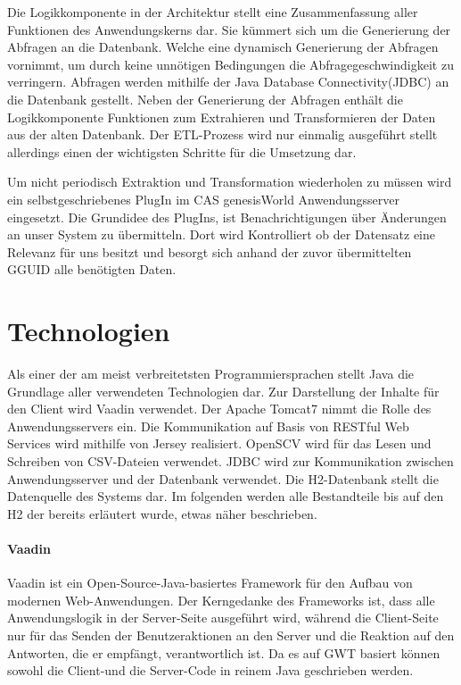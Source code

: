 Die Logikkomponente in der Architektur stellt eine Zusammenfassung aller Funktionen des Anwendungskerns dar. Sie kümmert sich um die Generierung der Abfragen an die Datenbank. Welche eine dynamisch Generierung der Abfragen vornimmt, um durch keine unnötigen Bedingungen die Abfragegeschwindigkeit zu verringern. Abfragen werden mithilfe der Java Database Connectivity(JDBC) an die Datenbank gestellt. Neben der Generierung der Abfragen enthält die Logikkomponente Funktionen zum Extrahieren und Transformieren der Daten aus der alten Datenbank. Der ETL-Prozess wird nur einmalig ausgeführt stellt allerdings einen der wichtigsten Schritte für die Umsetzung dar. 

Um nicht periodisch Extraktion und Transformation wiederholen zu müssen wird ein selbstgeschriebenes PlugIn im CAS genesisWorld Anwendungsserver eingesetzt. Die Grundidee des PlugIns, ist Benachrichtigungen über Änderungen an unser System zu übermitteln. Dort wird Kontrolliert ob der Datensatz eine Relevanz für uns besitzt und besorgt sich anhand der zuvor übermittelten GGUID alle benötigten Daten.

\section{Technologien}

Als einer der am meist verbreitetsten Programmiersprachen stellt Java die Grundlage aller verwendeten Technologien dar. Zur Darstellung der Inhalte für den Client wird Vaadin verwendet. Der Apache Tomcat7 nimmt die Rolle des Anwendungsservers ein. Die Kommunikation auf Basis von RESTful Web Services wird mithilfe von Jersey realisiert. OpenSCV wird für das Lesen und Schreiben von CSV-Dateien verwendet. JDBC wird zur Kommunikation zwischen Anwendungsserver und der Datenbank verwendet. Die H2-Datenbank stellt die Datenquelle des Systems dar. Im folgenden werden alle Bestandteile bis auf den H2 der bereits erläutert wurde, etwas näher beschrieben. 

\paragraph{Vaadin}

Vaadin ist ein Open-Source-Java-basiertes Framework für den Aufbau von modernen Web-Anwendungen. Der Kerngedanke des Frameworks ist, dass alle Anwendungslogik in der Server-Seite ausgeführt wird, während die Client-Seite nur für das Senden der Benutzeraktionen an den Server und die Reaktion auf den Antworten, die er empfängt, verantwortlich ist. Da es auf GWT basiert können sowohl die Client-und die Server-Code in reinem Java geschrieben werden.

